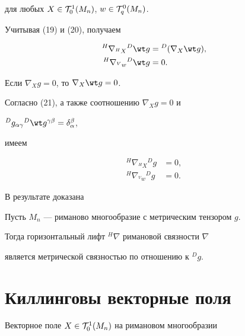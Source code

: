 для любых $X\in{\cal T}^1_0(M_n)$, $w\in{\cal T}^0_q(M_n)$.


Учитывая (19) и (20), получаем


\begin{equation}


\begin{split}


{}^H\nabla_{{}^HX}{}^D\wt g&={}^D(\nabla_X \wt g), \\


{}^H\nabla_{{}^Vw}{}^D\wt g&=0.


\end{split}


\end{equation}


Если $\nabla_X g=0$, то $\nabla_X\wt g=0$.


Согласно (21), а также  соотношению $\nabla_X g=0$ и


${}^Dg_{\alpha\gamma}{}^D\wt g{}^{\gamma\beta}=\delta^\beta_\alpha$,


имеем


\begin{align*}


{}^H\nabla_{{}^HX}{}^Dg&=0,\\


{}^H\nabla_{{}^Vw}{}^Dg&=0.


\end{align*}


В результате доказана





\begin{thm}


Пусть $M_n$ --- риманово многообразие с метрическим тензором $g$.


Тогда горизонтальный лифт ${}^H\nabla$ римановой связности $\nabla$


является метрической связностью по отношению к ${}^Dg$.


\end{thm}








\section{Киллинговы векторные поля}





Векторное поле $X\in{\cal T}^1_0(M_n)$ на римановом многообразии


